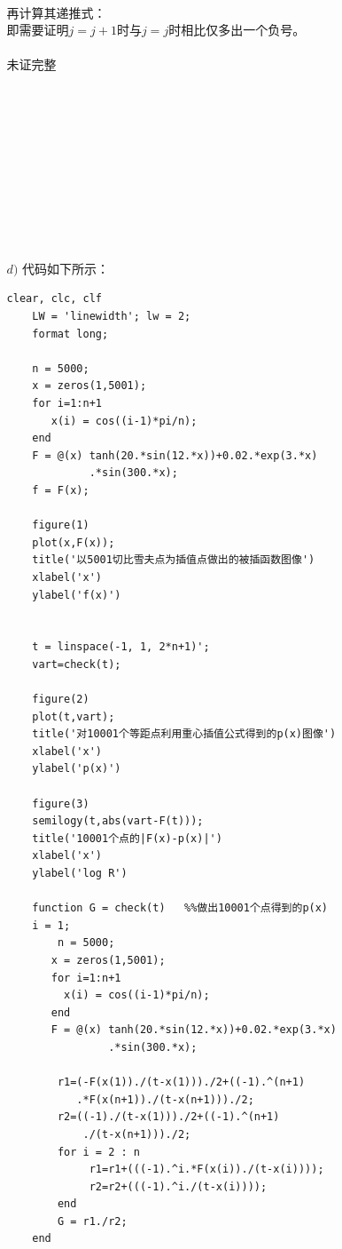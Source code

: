 \documentclass[12pt,a4paper,utf8]{ctexart}
\begin{document}
\begin{enumerate}
\begin{enumerate}
\begin{eqnarray}
        \end{eqnarray}
        再计算其递推式：\\
        即需要证明$j=j+1$时与$j=j$时相比仅多出一个负号。\\
            \\
            \quad \quad 未证完整
            \\
            \\
            \\
            \\
            \\
            \\
            \\
            \\
            \\
            \\
            \\



    \item[$d)$] 代码如下所示：
    \begin{lstlisting}[frame=single]
    clear, clc, clf
    LW = 'linewidth'; lw = 2;
    format long;
    
    n = 5000;
    x = zeros(1,5001);
    for i=1:n+1
       x(i) = cos((i-1)*pi/n); 
    end
    F = @(x) tanh(20.*sin(12.*x))+0.02.*exp(3.*x)
             .*sin(300.*x);
    f = F(x);
    
    figure(1)
    plot(x,F(x));
    title('以5001切比雪夫点为插值点做出的被插函数图像')
    xlabel('x')
    ylabel('f(x)')
    
    
    t = linspace(-1, 1, 2*n+1)';
    vart=check(t);
    
    figure(2)
    plot(t,vart);
    title('对10001个等距点利用重心插值公式得到的p(x)图像')
    xlabel('x')
    ylabel('p(x)')
    
    figure(3)
    semilogy(t,abs(vart-F(t)));
    title('10001个点的|F(x)-p(x)|')
    xlabel('x')
    ylabel('log R')
    
    function G = check(t)   %%做出10001个点得到的p(x)
    i = 1;
        n = 5000;
       x = zeros(1,5001);
       for i=1:n+1
         x(i) = cos((i-1)*pi/n); 
       end
       F = @(x) tanh(20.*sin(12.*x))+0.02.*exp(3.*x)
                .*sin(300.*x);
    
        r1=(-F(x(1))./(t-x(1)))./2+((-1).^(n+1)
           .*F(x(n+1))./(t-x(n+1)))./2;
        r2=((-1)./(t-x(1)))./2+((-1).^(n+1)
            ./(t-x(n+1)))./2;
        for i = 2 : n 
             r1=r1+(((-1).^i.*F(x(i))./(t-x(i))));
             r2=r2+(((-1).^i./(t-x(i))));
        end
        G = r1./r2;  
    end


\end{lstlisting}
\end{enumerate}
\end{enumerate}
\end{document}
